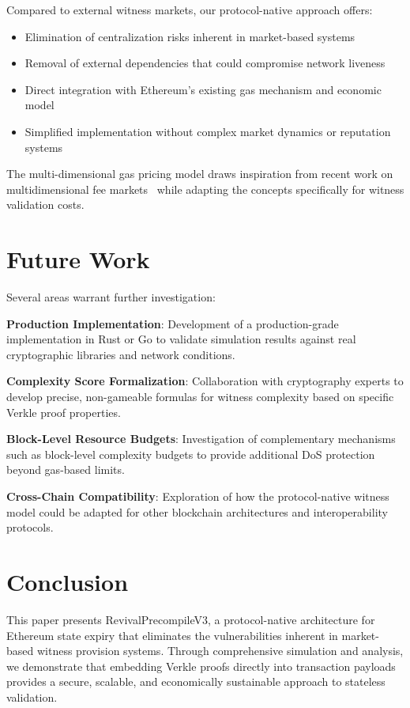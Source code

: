 \documentclass{article}
\begin{document}
Compared to external witness markets, our protocol-native approach offers:
\begin{itemize}
\item Elimination of centralization risks inherent in market-based systems
\item Removal of external dependencies that could compromise network liveness
\item Direct integration with Ethereum's existing gas mechanism and economic model
\item Simplified implementation without complex market dynamics or reputation systems
\end{itemize}

The multi-dimensional gas pricing model draws inspiration from recent work on multidimensional fee markets~\cite{buterin2022multi} while adapting the concepts specifically for witness validation costs.

\section{Future Work}

Several areas warrant further investigation:

\textbf{Production Implementation}: Development of a production-grade implementation in Rust or Go to validate simulation results against real cryptographic libraries and network conditions.

\textbf{Complexity Score Formalization}: Collaboration with cryptography experts to develop precise, non-gameable formulas for witness complexity based on specific Verkle proof properties.

\textbf{Block-Level Resource Budgets}: Investigation of complementary mechanisms such as block-level complexity budgets to provide additional DoS protection beyond gas-based limits.

\textbf{Cross-Chain Compatibility}: Exploration of how the protocol-native witness model could be adapted for other blockchain architectures and interoperability protocols.

\section{Conclusion}

This paper presents RevivalPrecompileV3, a protocol-native architecture for Ethereum state expiry that eliminates the vulnerabilities inherent in market-based witness provision systems. Through comprehensive simulation and analysis, we demonstrate that embedding Verkle proofs directly into transaction payloads provides a secure, scalable, and economically sustainable approach to stateless validation.
\end{document}
